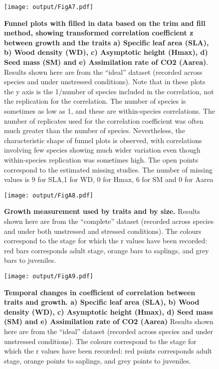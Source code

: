 \documentclass[a4paper,11pt]{article}
\begin{document}
\begin{appendices}
\begin{figure}[h!]
\centering
\texttt{[image: output/FigA7.pdf]}
\caption{\textbf{Funnel plots with filled in data based on the trim and fill method, showing transformed correlation coefficient z between growth and the traits a) Specific leaf area (SLA), b) Wood density (WD), c) Asymptotic height (Hmax), d) Seed mass (SM) and e) Assimilation rate of CO2 (Aarea)}. Results shown here are from the ``ideal'' dataset (recorded across species and under unstressed conditions).  Note that in these plots the y axis is the 1/number of species included in the correlation, not the replication for the correlation. The number of species is sometimes as low as 1, and these are within-species correlations. The number of replicates used for the correlation coefficient was often much greater than the number of species. Nevertheless, the characteristic shape of funnel plots is observed, with correlations involving few species showing much wider variation even though within-species replication was sometimes high. The open points correspond to the estimated missing studies. The number of missing values is 9 for SLA,1 for WD, 0 for Hmax, 6 for SM and 0 for Aarea}
\label{fig:figA7}
\end{figure}

\begin{figure}[h!]
\centering
\texttt{[image: output/FigA8.pdf]}
\caption{\textbf{Growth measurement used by traits and by size.} Results shown here are from the ``complete'' dataset (recorded across species and under both unstressed and stressed conditions). The colours correspond to the stage for which the r values have been recorded: red bars corresponds adult stage, orange bars to saplings, and grey bars to juveniles.}
\label{fig:figA8}
\end{figure}

\begin{figure}[h!]
\centering
\texttt{[image: output/FigA9.pdf]}
\caption{\textbf{Temporal changes in coefficient of correlation between traits and growth. a) Specific leaf area (SLA), b) Wood density (WD), c) Asymptotic height (Hmax), d) Seed mass (SM) and e) Assimilation rate of CO2 (Aarea)} Results shown here are from the ``ideal'' dataset (recorded across species and under  unstressed conditions). The colours correspond to the stage for which the r values have been recorded: red points corresponds adult stage, orange points to saplings, and grey points to juveniles.}
\label{fig:figA9}
\end{figure}


\end{appendices}
\end{document}
